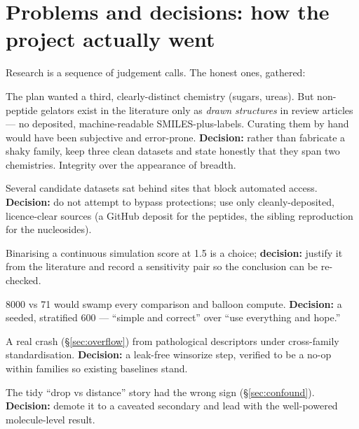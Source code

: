 \documentclass[11pt]{article}
\begin{document}
\section{Problems and decisions: how the project actually went}\label{sec:decisions}

Research is a sequence of judgement calls. The honest ones, gathered:

\begin{description}[leftmargin=1.6em,style=nextline]
  \item[No clean non-peptide family.] The plan wanted a third, clearly-distinct
    chemistry (sugars, ureas). But non-peptide gelators exist in the literature
    only as \emph{drawn structures} in review articles --- no deposited,
    machine-readable SMILES-plus-labels. Curating them by hand would have been
    subjective and error-prone. \textbf{Decision:} rather than fabricate a shaky
    family, keep three clean datasets and state honestly that they span two
    chemistries. Integrity over the appearance of breadth.
  \item[Publisher paywalls / bot-blocking.] Several candidate datasets sat behind
    sites that block automated access. \textbf{Decision:} do not attempt to bypass
    protections; use only cleanly-deposited, licence-clear sources (a GitHub
    deposit for the peptides, the sibling reproduction for the nucleosides).
  \item[The AP threshold.] Binarising a continuous simulation score at 1.5 is a
    choice; \textbf{decision:} justify it from the literature and record a
    sensitivity pair so the conclusion can be re-checked.
  \item[The tripeptide subsample.] 8000 vs 71 would swamp every comparison and
    balloon compute. \textbf{Decision:} a seeded, stratified 600 --- ``simple and
    correct'' over ``use everything and hope.''
  \item[The float32 overflow.] A real crash (\S\ref{sec:overflow}) from pathological
    descriptors under cross-family standardisation. \textbf{Decision:} a
    leak-free winsorize step, verified to be a no-op within families so existing
    baselines stand.
  \item[The AD confound.] The tidy ``drop vs distance'' story had the wrong sign
    (\S\ref{sec:confound}). \textbf{Decision:} demote it to a caveated secondary
    and lead with the well-powered molecule-level result.
\end{description}
\end{document}
